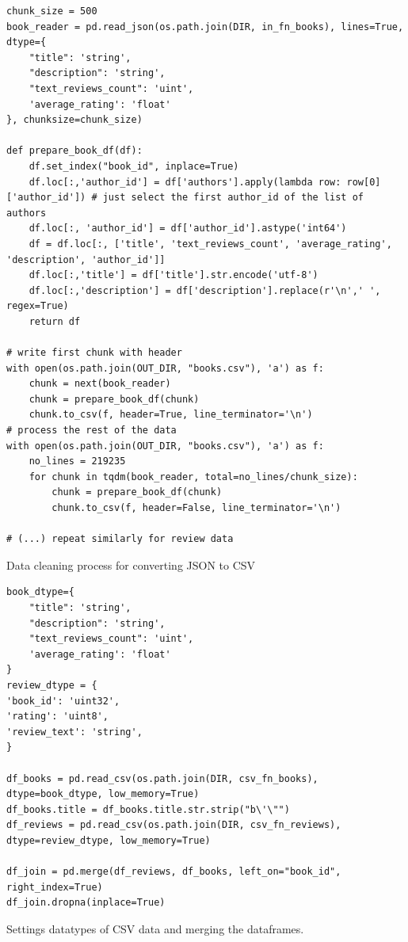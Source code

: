 \documentclass[10pt,final,journal,a4paper,oneside,twocolumn]{IEEEtran}
\begin{document}
\begin{listing}[h]
    \begin{verbatim}
chunk_size = 500
book_reader = pd.read_json(os.path.join(DIR, in_fn_books), lines=True, dtype={
    "title": 'string', 
    "description": 'string', 
    "text_reviews_count": 'uint', 
    'average_rating': 'float'
}, chunksize=chunk_size)

def prepare_book_df(df):
    df.set_index("book_id", inplace=True)
    df.loc[:,'author_id'] = df['authors'].apply(lambda row: row[0]['author_id']) # just select the first author_id of the list of authors
    df.loc[:, 'author_id'] = df['author_id'].astype('int64')
    df = df.loc[:, ['title', 'text_reviews_count', 'average_rating', 'description', 'author_id']]
    df.loc[:,'title'] = df['title'].str.encode('utf-8')
    df.loc[:,'description'] = df['description'].replace(r'\n',' ', regex=True) 
    return df

# write first chunk with header
with open(os.path.join(OUT_DIR, "books.csv"), 'a') as f:
    chunk = next(book_reader)
    chunk = prepare_book_df(chunk)
    chunk.to_csv(f, header=True, line_terminator='\n')  
# process the rest of the data
with open(os.path.join(OUT_DIR, "books.csv"), 'a') as f:
    no_lines = 219235
    for chunk in tqdm(book_reader, total=no_lines/chunk_size):
        chunk = prepare_book_df(chunk)
        chunk.to_csv(f, header=False, line_terminator='\n')

# (...) repeat similarly for review data
    \end{verbatim}
\caption{\small Data cleaning process for converting JSON to CSV}
\label{lst:data_loading}
\end{listing}
\begin{listing}[h]
    \begin{verbatim}
book_dtype={
    "title": 'string', 
    "description": 'string', 
    "text_reviews_count": 'uint', 
    'average_rating': 'float'
}
review_dtype = {
'book_id': 'uint32',
'rating': 'uint8',
'review_text': 'string',
}

df_books = pd.read_csv(os.path.join(DIR, csv_fn_books), dtype=book_dtype, low_memory=True)
df_books.title = df_books.title.str.strip("b\'\"") 
df_reviews = pd.read_csv(os.path.join(DIR, csv_fn_reviews), dtype=review_dtype, low_memory=True)

df_join = pd.merge(df_reviews, df_books, left_on="book_id", right_index=True)
df_join.dropna(inplace=True)
    \end{verbatim}
\caption{\small Settings datatypes of CSV data and merging the dataframes.}
\label{lst:data_prep}
\end{listing}
\end{document}
